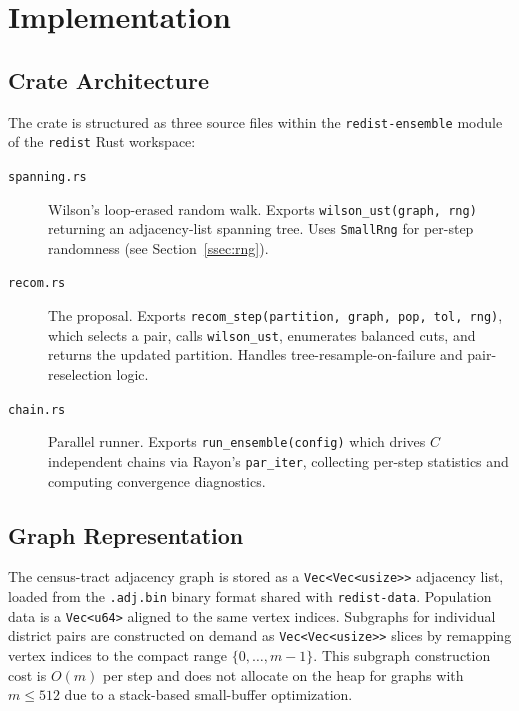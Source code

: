 \section{Implementation}
\label{sec:implementation}

\subsection{Crate Architecture}

The \re{} crate is structured as three source files within the
\texttt{redist-ensemble} module of the \texttt{redist} Rust workspace:

\begin{description}
  \item[\texttt{spanning.rs}] Wilson's loop-erased random walk.
    Exports \texttt{wilson\_ust(graph, rng)} returning an adjacency-list
    spanning tree. Uses \texttt{SmallRng} for per-step randomness (see
    Section~\ref{ssec:rng}).

  \item[\texttt{recom.rs}] The \recom{} proposal.
    Exports \texttt{recom\_step(partition, graph, pop, tol, rng)},
    which selects a pair, calls \texttt{wilson\_ust}, enumerates balanced
    cuts, and returns the updated partition.
    Handles tree-resample-on-failure and pair-reselection logic.

  \item[\texttt{chain.rs}] Parallel runner.
    Exports \texttt{run\_ensemble(config)} which drives $C$ independent
    chains via Rayon's \texttt{par\_iter}, collecting per-step statistics
    and computing convergence diagnostics.
\end{description}

\subsection{Graph Representation}

The census-tract adjacency graph is stored as a \texttt{Vec<Vec<usize>>}
adjacency list, loaded from the \texttt{.adj.bin} binary format shared
with \texttt{redist-data}.
Population data is a \texttt{Vec<u64>} aligned to the same vertex
indices.
Subgraphs for individual district pairs are constructed on demand as
\texttt{Vec<Vec<usize>>} slices by remapping vertex indices to the
compact range $\{0,\ldots,m-1\}$.
This subgraph construction cost is $O(m)$ per step and does not allocate
on the heap for graphs with $m \leq 512$ due to a stack-based small-buffer
optimization.

